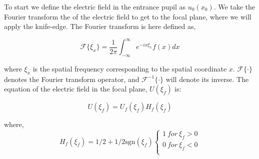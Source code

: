 
To start we define the electric field in the entrance pupil as $u_0(x_0)$. We take the Fourier transform the of the electric field to get to the focal plane, where we will apply the knife-edge. The Fourier transform is here defined as,

\begin{equation}
    \mathcal{F}\{\xi_x\}=\frac{1}{2\pi}\int_{-\infty}^\infty e^{-i x \xi_x} f(x) dx
    \label{FourierT}
\end{equation}

\noindent where $\xi_x$ is the spatial frequency corresponding to the spatial coordinate $x$. $\mathcal{F}\{\cdot\}$ denotes the Fourier transform operator, and  $\mathcal{F}^{-1}\{\cdot\}$ will denote its inverse. The equation of the electric field in the focal plane, $U(\xi_f)$ is:

\begin{equation}
    U (\xi_f)=U_f(\xi_f)H_f(\xi_f)
    \label{FT}
\end{equation}

\noindent where,
\[ 
H_f(\xi_f)= 1/2+1/2\mbox{sgn}(\xi_f) \left\{
\begin{array}{ll}
      1 \: for \: \xi_f >0\\
      0 \: for \: \xi_f <0\\
      
\end{array} 
\right. 
\]

